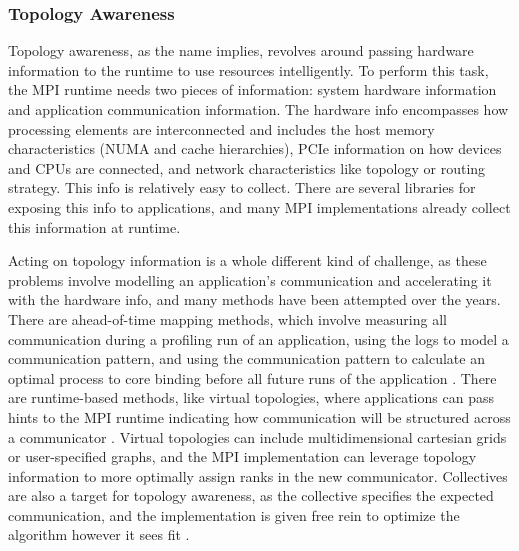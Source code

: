 \subsubsection{Topology Awareness}
Topology awareness, as the name implies, revolves around passing hardware information to the runtime to use resources intelligently.
To perform this task, the \gls{MPI} runtime needs two pieces of information: system hardware information and application communication information.
The hardware info encompasses how processing elements are interconnected and includes the host memory characteristics (\gls{NUMA} and cache hierarchies), \gls{PCIe} information on how devices and \gls{CPU}s are connected, and network characteristics like topology or routing strategy.
This info is relatively easy to collect.
There are several libraries for exposing this info to applications, and many \gls{MPI} implementations already collect this information at runtime.

Acting on topology information is a whole different kind of challenge, as these problems involve modelling an application's communication and accelerating it with the hardware info, and many methods have been attempted over the years.
There are ahead-of-time mapping methods, which involve measuring all communication during a profiling run of an application, using the logs to model a communication pattern, and using the communication pattern to calculate an optimal process to core binding before all future runs of the application \cite{Hoefler2011GenericTopoMappingStrats,Mirsadeghi2016PTRAM}. 
There are runtime-based methods, like virtual topologies, where applications can pass hints to the \gls{MPI} runtime indicating how communication will be structured across a communicator \cite{Gropp2019CartTopoMapping}.
Virtual topologies can include multidimensional cartesian grids or user-specified graphs, and the \gls{MPI} implementation can leverage topology information to more optimally assign ranks in the new communicator.
Collectives are also a target for topology awareness, as the collective specifies the expected communication, and the implementation is given free rein to optimize the algorithm however it sees fit \cite{Mirsadeghi2016TopoAwareCollRR, Luo2018ADAPT}.

